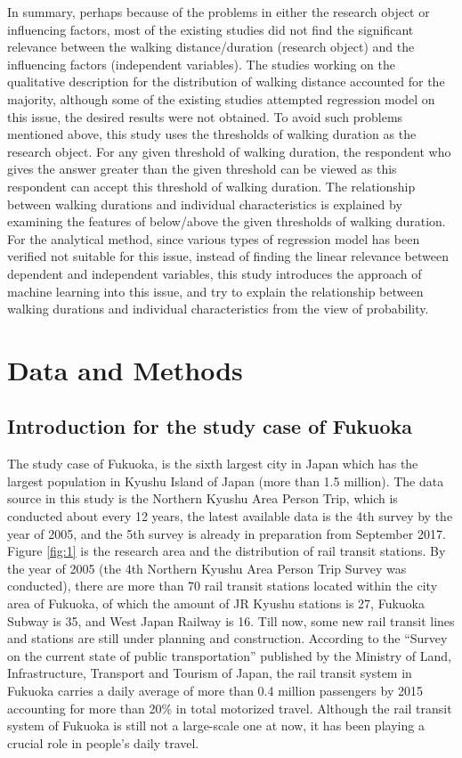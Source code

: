 \documentclass[Journal,letterpaper]{ascelike-new}
\begin{document}
%
In summary, perhaps because of the problems in either the research object or influencing factors, most of the existing studies did not find the significant relevance between the walking distance/duration (research object) and the influencing factors (independent variables). The studies working on the qualitative description for the distribution of walking distance accounted for the majority, although some of the existing studies attempted regression model on this issue, the desired results were not obtained. To avoid such problems mentioned above, this study uses the thresholds of walking duration as the research object. For any given threshold of walking duration, the respondent who gives the answer greater than the given threshold can be viewed as this respondent can accept this threshold of walking duration. The relationship between walking durations and individual characteristics is explained by examining the features of below/above the given thresholds of walking duration. For the analytical method, since various types of regression model has been verified not suitable for this issue, instead of finding the linear relevance between dependent and independent variables, this study introduces the approach of machine learning into this issue, and try to explain the relationship between walking durations and individual characteristics from the view of probability.

%
\section{Data and Methods}

%
\subsection{Introduction for the study case of Fukuoka}
The study case of Fukuoka, is the sixth largest city in Japan which has the largest population in Kyushu Island of Japan (more than 1.5 million). The data source in this study is the Northern Kyushu Area Person Trip, which is conducted about every 12 years, the latest available data is the 4th survey by the year of 2005, and the 5th survey is already in preparation from September 2017. Figure \ref{fig:1} is the research area and the distribution of rail transit stations. By the year of 2005 (the 4th Northern Kyushu Area Person Trip Survey was conducted), there are more than 70 rail transit stations located within the city area of Fukuoka, of which the amount of JR Kyushu stations is 27, Fukuoka Subway is 35, and West Japan Railway is 16. Till now, some new rail transit lines and stations are still under planning and construction. According to the “Survey on the current state of public transportation” published by the Ministry of Land, Infrastructure, Transport and Tourism of Japan, the rail transit system in Fukuoka carries a daily average of more than 0.4 million passengers by 2015 accounting for more than 20\% in total motorized travel. Although the rail transit system of Fukuoka is still not a large-scale one at now, it has been playing a crucial role in people's daily travel.
\end{document}
